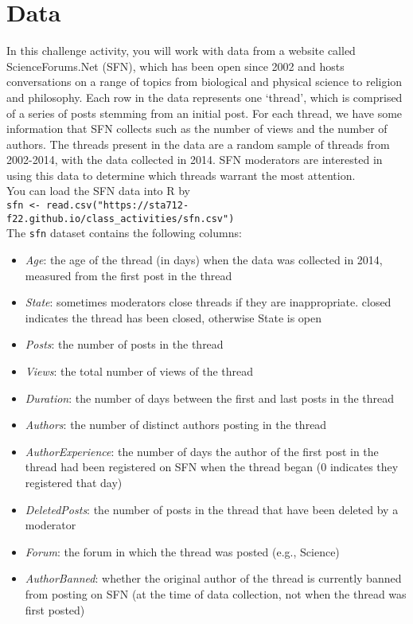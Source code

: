 \documentclass[11pt]{article}
\begin{document}
\section*{Data}

In this challenge activity, you will work with data from a website called ScienceForums.Net (SFN), which has been open since 2002 and hosts conversations on a range of topics from biological and physical science to religion and philosophy. Each row in the data represents one ‘thread’, which is comprised of a series of posts stemming from an initial post. For each thread, we have some information that SFN collects such as the number of views and the number of authors. The threads present in the data are a random sample of threads from 2002-2014, with the data collected in 2014. SFN moderators are interested in using this data to determine which threads warrant the most attention.\\

\noindent You can load the SFN data into R by\\

\verb;sfn <- read.csv("https://sta712-f22.github.io/class_activities/sfn.csv");\\


\noindent The \texttt{sfn} dataset contains the following columns:

\begin{itemize}
\item \textit{Age}: the age of the thread (in days) when the data was collected in 2014, measured from the first post in the thread
\item \textit{State}: sometimes moderators close threads if they are inappropriate. closed indicates the thread has been closed, otherwise State is open
\item \textit{Posts}: the number of posts in the thread
\item \textit{Views}: the total number of views of the thread
\item \textit{Duration}: the number of days between the first and last posts in the thread
\item \textit{Authors}: the number of distinct authors posting in the thread
\item \textit{AuthorExperience}: the number of days the author of the first post in the thread had been registered on SFN when the thread began (0 indicates they registered that day)
\item \textit{DeletedPosts}: the number of posts in the thread that have been deleted by a moderator
\item \textit{Forum}: the forum in which the thread was posted (e.g., Science)
\item \textit{AuthorBanned}: whether the original author of the thread is currently banned from posting on SFN (at the time of data collection, not when the thread was first posted)
\end{itemize}
\end{document}
